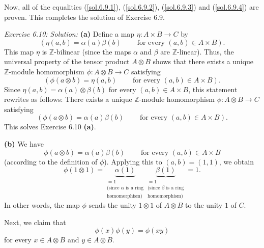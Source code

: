 \documentclass[numbers=enddot,12pt,final,onecolumn,notitlepage]{scrartcl}%
\begin{document}
Now, all of the equalities (\ref{sol.6.9.1}), (\ref{sol.6.9.2}),
(\ref{sol.6.9.3}) and (\ref{sol.6.9.4}) are proven. This completes the
solution of Exercise 6.9.

\textit{Exercise 6.10: Solution:} \textbf{(a)} Define a map $\eta:A\times
B\rightarrow C$ by%
\[
\left(  \eta\left(  a,b\right)  =\alpha\left(  a\right)  \beta\left(
b\right)  \ \ \ \ \ \ \ \ \ \ \text{for every }\left(  a,b\right)  \in A\times
B\right)  .
\]
This map $\eta$ is $\mathbb{Z}$-bilinear (since the maps $\alpha$ and $\beta$
are $\mathbb{Z}$-linear). Thus, the universal property of the tensor product
$A\otimes B$ shows that there exists a unique $\mathbb{Z}$-module homomorphism
$\phi:A\otimes B\rightarrow C$ satisfying%
\[
\left(  \phi\left(  a\otimes b\right)  =\eta\left(  a,b\right)
\ \ \ \ \ \ \ \ \ \ \text{for every }\left(  a,b\right)  \in A\times B\right)
.
\]
Since $\eta\left(  a,b\right)  =\alpha\left(  a\right)  \otimes\beta\left(
b\right)  $ for every $\left(  a,b\right)  \in A\times B$, this statement
rewrites as follows: There exists a unique $\mathbb{Z}$-module homomorphism
$\phi:A\otimes B\rightarrow C$ satisfying%
\[
\left(  \phi\left(  a\otimes b\right)  =\alpha\left(  a\right)  \beta\left(
b\right)  \ \ \ \ \ \ \ \ \ \ \text{for every }\left(  a,b\right)  \in A\times
B\right)  .
\]
This solves Exercise 6.10 \textbf{(a)}.

\textbf{(b)} We have%
\begin{equation}
\phi\left(  a\otimes b\right)  =\alpha\left(  a\right)  \beta\left(  b\right)
\ \ \ \ \ \ \ \ \ \ \text{for every }\left(  a,b\right)  \in A\times B
\label{sol.6.10.b.1}%
\end{equation}
(according to the definition of $\phi$). Applying this to $\left(  a,b\right)
=\left(  1,1\right)  $, we obtain
\[
\phi\left(  1\otimes1\right)  =\underbrace{\alpha\left(  1\right)
}_{\substack{=1\\\text{(since }\alpha\text{ is a ring}\\\text{homomorphism)}%
}}\underbrace{\beta\left(  1\right)  }_{\substack{=1\\\text{(since }%
\beta\text{ is a ring}\\\text{homomorphism)}}}=1.
\]
In other words, the map $\phi$ sends the unity $1\otimes1$ of $A\otimes B$ to
the unity $1$ of $C$.

Next, we claim that
\begin{equation}
\phi\left(  x\right)  \phi\left(  y\right)  =\phi\left(  xy\right)
\label{sol.6.10.b.2}%
\end{equation}
for every $x\in A\otimes B$ and $y\in A\otimes B$.
\end{document}
